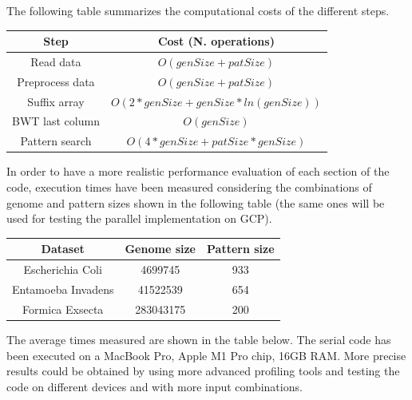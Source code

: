 \documentclass[final,5p,times,twocolumn,authoryear]{elsarticle}
\begin{document}
The following table summarizes the computational costs of the different steps.
\begin{center}
\begin{tabular}{|| c c ||}
\hline
Step & Cost (N. operations) \\
\hline
 Read data & $O(genSize + patSize)$ \\ 
 Preprocess data & $O(genSize + patSize)$ \\  
 Suffix array & $O(2*genSize + genSize*ln(genSize))$ \\
 BWT last column & $O(genSize)$ \\
 Pattern search & $O(4*genSize + patSize*genSize)$ \\
\hline
\end{tabular}
\end{center}
In order to have a more realistic performance evaluation of each section of the code, execution times have been measured considering the combinations of genome and pattern sizes shown in the following table (the same ones will be used for testing the parallel implementation on GCP).
\begin{center}
\begin{tabular}{|| c c c ||}
\hline
Dataset & Genome size & Pattern size \\
\hline
 Escherichia Coli & 4699745 & 933 \\
 Entamoeba Invadens & 41522539 & 654 \\
 Formica Exsecta & 283043175 & 200 \\
\hline
\end{tabular}
\end{center}
The average times measured are shown in the table below. The serial code has been executed on a MacBook Pro, Apple M1 Pro chip, 16GB RAM. More precise results could be obtained by using more advanced profiling tools and testing the code on different devices and with more input combinations.
\end{document}
